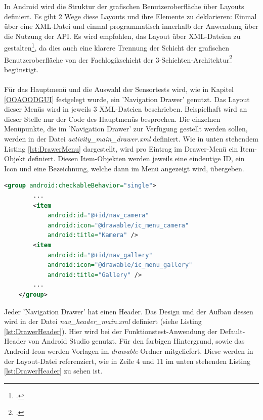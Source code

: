 In Android wird die Struktur der grafischen Benutzeroberfläche über Layouts definiert. Es gibt 2 Wege diese Layouts und ihre Elemente zu deklarieren: Einmal über eine XML-Datei und einmal programmatisch innerhalb der Anwendung über die Nutzung der API. Es wird empfohlen, das Layout über XML-Dateien zu gestalten\footcite{AndroidAPI}, da dies auch eine klarere Trennung der Schicht der grafischen Benutzeroberfläche von der Fachlogikschicht der 3-Schichten-Architektur\footcite{SWTBalzert} begünstigt. 
\\
\\
Für das Hauptmenü und die Auswahl der Sensortests wird, wie in Kapitel \ref{OOAOODGUI} festgelegt wurde, ein 'Navigation Drawer' genutzt. Das Layout dieser Menüs wird in jeweils 3 XML-Dateien beschrieben. Beispielhaft wird an dieser Stelle nur der Code des Hauptmenüs besprochen. Die einzelnen Menüpunkte, die im 'Navigation Drawer' zur Verfügung gestellt werden sollen, werden in der Datei \textit{activity\_main\_drawer.xml} definiert. Wie in unten stehendem Listing \ref{lst:DrawerMenu} dargestellt, wird pro Eintrag im Drawer-Menü ein Item-Objekt definiert. Diesen Item-Objekten werden jeweils eine eindeutige ID, ein Icon und eine Bezeichnung, welche dann im Menü angezeigt wird, übergeben. 

\begin{lstlisting}[caption=Definition der Menüpunkte im 'Navigation Drawer' der Hauptseite in der Datei \textit{activity\_main\_drawer.xml}, label=lst:DrawerMenu, language=XML]
<group android:checkableBehavior="single">      
		...              
        <item
            android:id="@+id/nav_camera"
            android:icon="@drawable/ic_menu_camera"
            android:title="Kamera" />
        <item
            android:id="@+id/nav_gallery"
            android:icon="@drawable/ic_menu_gallery"
            android:title="Gallery" />       
		...               
    </group>
\end{lstlisting} 

Jeder 'Navigation Drawer' hat einen Header. Das Design und der Aufbau dessen wird in der Datei \textit{nav\_header\_main.xml} definiert (siehe Listing \ref{lst:DrawerHeader}). Hier wird bei der Funktionstest-Anwendung der Default-Header von Android Studio genutzt. Für den farbigen Hintergrund, sowie das Android-Icon werden Vorlagen im \textit{drawable}-Ordner mitgeliefert. Diese werden in der Layout-Datei referenziert, wie in Zeile 4 und 11 im unten stehenden Listing \ref{lst:DrawerHeader} zu sehen ist.
\clearpage

